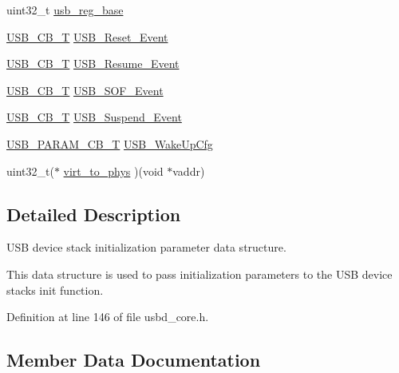 \begin{DoxyCompactItemize}
\item 
uint32\+\_\+t \hyperlink{structUSBD__API__INIT__PARAM_a171d80187485a767c4fdf4dc4c4f330a}{usb\+\_\+reg\+\_\+base}
\item 
\hyperlink{group__USBD__Core_ga0404ce046312aa5c798cc4a05c417e46}{U\+S\+B\+\_\+\+C\+B\+\_\+T} \hyperlink{structUSBD__API__INIT__PARAM_a49f0d2a8b163486e07cfea83b436234f}{U\+S\+B\+\_\+\+Reset\+\_\+\+Event}
\item 
\hyperlink{group__USBD__Core_ga0404ce046312aa5c798cc4a05c417e46}{U\+S\+B\+\_\+\+C\+B\+\_\+T} \hyperlink{structUSBD__API__INIT__PARAM_a2fb170236fa92a20f29dc8c13b24a1d1}{U\+S\+B\+\_\+\+Resume\+\_\+\+Event}
\item 
\hyperlink{group__USBD__Core_ga0404ce046312aa5c798cc4a05c417e46}{U\+S\+B\+\_\+\+C\+B\+\_\+T} \hyperlink{structUSBD__API__INIT__PARAM_af6f224a6b2ddee3c5b2056a62fa84914}{U\+S\+B\+\_\+\+S\+O\+F\+\_\+\+Event}
\item 
\hyperlink{group__USBD__Core_ga0404ce046312aa5c798cc4a05c417e46}{U\+S\+B\+\_\+\+C\+B\+\_\+T} \hyperlink{structUSBD__API__INIT__PARAM_a3c256417cf3bdd576029d29787d6046f}{U\+S\+B\+\_\+\+Suspend\+\_\+\+Event}
\item 
\hyperlink{group__USBD__Core_ga7df622c61ebb152b83dd5972ac789b28}{U\+S\+B\+\_\+\+P\+A\+R\+A\+M\+\_\+\+C\+B\+\_\+T} \hyperlink{structUSBD__API__INIT__PARAM_a3166b630a5aa02ca07bd3df8496aba5b}{U\+S\+B\+\_\+\+Wake\+Up\+Cfg}
\item 
uint32\+\_\+t($\ast$ \hyperlink{structUSBD__API__INIT__PARAM_a3f58316f83bb0523073216d80ae35e8d}{virt\+\_\+to\+\_\+phys} )(void $\ast$vaddr)
\end{DoxyCompactItemize}


\subsection{Detailed Description}
U\+SB device stack initialization parameter data structure. 

This data structure is used to pass initialization parameters to the U\+SB device stack\textquotesingle{}s init function. 

Definition at line 146 of file usbd\+\_\+core.\+h.



\subsection{Member Data Documentation}

